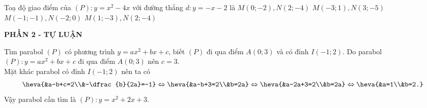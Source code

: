 \begin{ex}%
	Toạ độ giao điểm của $(P)\colon y=x^2-4x$ với đường thẳng $d\colon y=-x-2$ là
	\choice
	{$M(0;-2), N(2;-4)$}
	{$M(-3;1), N(3;-5)$}
	{$M(-1;-1), N(-2;0)$}
	{\True $M(1;-3), N(2;-4)$}
\end{ex}




\begin{center}
	\textbf{PHẦN 2 - TỰ LUẬN}
\end{center}


\begin{bt}%
Tìm parabol $(P)$ có phương trình $y=ax^2+bx+c$, biết $(P)$ đi qua điểm $A(0;3)$ và có đỉnh $I(-1;2)$.
\loigiai
{
Do parabol $(P)\colon y=ax^2+bx+c$ đi qua điểm $A(0;3)$ nên $c=3$.\\
Mặt khác parabol có đỉnh $I(-1;2)$ nên ta có
\[\heva{&a-b+c=2\\&-\dfrac{b}{2a}=-1}\Leftrightarrow\heva{&a-b+3=2\\&b=2a}\Leftrightarrow\heva{&a-2a+3=2\\&b=2a}\Leftrightarrow\heva{&a=1\\&b=2.}\]
Vậy parabol cần tìm là $(P)\colon y=x^2+2x+3$.
}
\end{bt}

